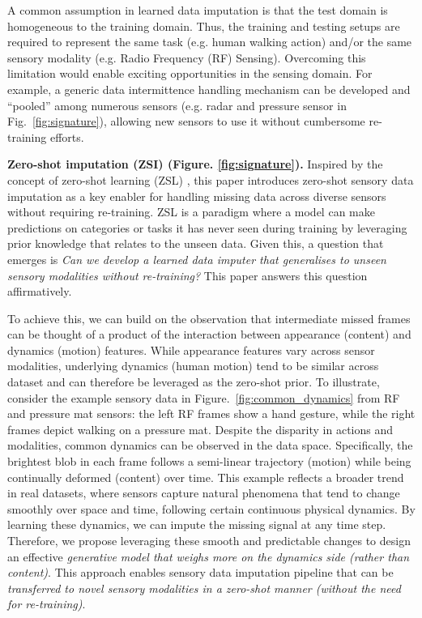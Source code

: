\documentclass[10pt, conference, compsocconf]{IEEEtran}
\begin{document}
A common assumption in learned data imputation is that the test domain is homogeneous to the training domain. Thus, the training and testing setups are required to represent the same task (e.g. human walking action) and/or the same sensory modality (e.g. Radio Frequency (RF) Sensing). Overcoming this limitation would enable exciting opportunities in the sensing domain.  For example, a generic data intermittence handling mechanism can be developed and ``pooled'' among numerous sensors (e.g. radar and pressure sensor in Fig.~\ref{fig:signature}), allowing new sensors to use it without cumbersome re-training efforts.





\textbf{Zero-shot imputation (ZSI) (Figure. \ref{fig:signature}).} Inspired by the concept of zero-shot learning (ZSL) \cite {pourpanah2022review}, this paper introduces zero-shot sensory data imputation as a key enabler for handling missing data across diverse sensors without requiring re-training. ZSL is a paradigm where a model can make predictions on categories or tasks it has never seen during training by leveraging prior knowledge that relates to the unseen data. Given this, a question that emerges is \textit{Can we develop a learned data imputer that generalises to unseen sensory modalities without re-training?} This paper answers this question affirmatively.

To achieve this, we can build on the observation that intermediate missed frames can be thought of a product of the interaction between appearance (content) and dynamics (motion) features. While appearance features vary across sensor modalities, underlying dynamics (human motion) tend to be similar across dataset and can therefore be leveraged as the zero-shot prior. To illustrate, consider the example sensory data in Figure.~\ref{fig:common_dynamics} from RF and pressure mat sensors: the left RF frames show a hand gesture, while the right frames depict walking on a pressure mat. Despite the disparity in actions and modalities, common dynamics can be observed in the data space. Specifically, the brightest blob in each frame follows a semi-linear trajectory (motion) while being continually deformed (content) over time.
This example reflects a broader trend in real datasets, where sensors capture natural phenomena that tend to change smoothly over space and time, following certain continuous physical dynamics.  By learning these dynamics, we can impute the missing signal at any time step. Therefore, we propose leveraging these smooth and predictable changes to design an effective \textit{generative model that weighs more on the dynamics side (rather than content)}. This approach enables sensory data imputation pipeline that can be \textit{transferred to novel sensory modalities in a zero-shot manner (without the need for re-training)}.
\end{document}
